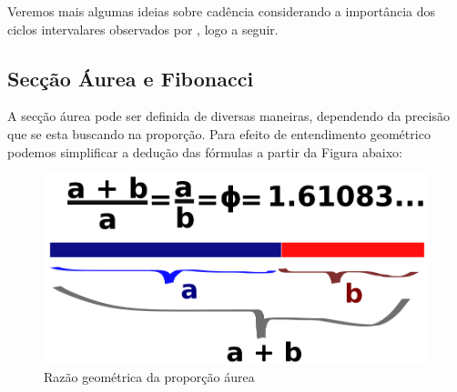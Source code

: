 \documentclass[
	12pt,				%
	openright,			%
	twoside,			%
	a4paper,			%
	english,			%
	french,				%
	spanish,			%
	brazil				%
	]{abntex2}
\begin{document}
Veremos mais algumas ideias sobre cadência considerando a importância dos ciclos intervalares observados por , logo a seguir.

















\subsection{Secção Áurea e Fibonacci}
\label{fibo}

A secção áurea pode ser definida de diversas maneiras, dependendo da precisão que se esta buscando na proporção. Para efeito de entendimento geométrico podemos simplificar a dedução das fórmulas a partir da Figura abaixo: 

\begin{figure}[!h]
	\caption{\label{fig_grafico}Razão geométrica da proporção áurea }
	\begin{center}
	    \includegraphics[scale=0.25]{axis/proportionaurea.png}
	\end{center}
\end{figure}	
\end{document}
